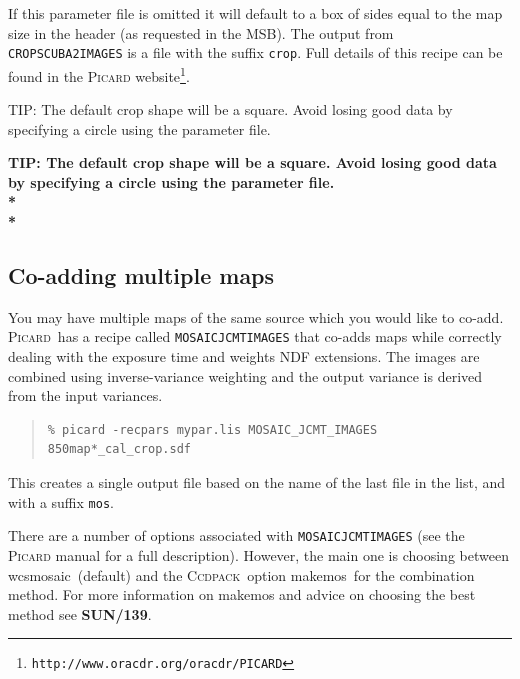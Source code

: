 \documentclass[twoside,11pt]{article}
\newcommand{\htmladdnormallink}[2]{#1}
\newenvironment{latexonly}{}{}
\newcommand{\latex}[1]{#1}
\newcommand{\xref}[3]{#1}
\newcommand{\xlabel}[1]{}
\renewcommand{\_}{\texttt{\symbol{95}}}
\newenvironment{fmpage}[1]{\begin{lrbox}{\fmbox}\begin{minipage}{#1}}{\end{minipage}\end{lrbox}\fbox{\usebox{\fmbox}}}
\newenvironment{myquote}{
   \color{MidnightBlue}\begin{quote}\begin{small}}{
   \end{small}\end{quote}
}
\newcommand{\ccdpack}{\xref{\textsc{Ccdpack}}{sun139}{}}
\newcommand{\picard}{\xref{\textsc{Picard}}{sun265}{}}
\newcommand{\drrecipe}[1]{\texttt{#1}}
\newcommand{\task}[1]{\textsf{#1}}
\newcommand{\file}[1]{\texttt{#1}}
\newcommand{\url}[1]{\texttt{#1}}
\newcommand{\wcsmosaic}{\xref{\task{wcsmosaic}}{sun95}{WCSMOSAIC}}
\newcommand{\makemos}{\xref{\task{makemos}}{sun139}{MAKEMOS}}
\renewenvironment{myquote}{
      \begin{quote}\begin{small}}{
      \end{small}\end{quote}
   }
\begin{document}
If this parameter file is omitted it will default to a box of sides
equal to the map size in the header (as requested in the MSB). The
output from \drrecipe{CROP\_SCUBA2\_IMAGES} is a file with the suffix
\file{\_crop}. Full details of this recipe can be found in the
\htmladdnormallink{\textsc{Picard}
website}{http://www.oracdr.org/oracdr/PICARD}\latex{\footnote{\url{http://www.oracdr.org/oracdr/PICARD}}}.

\begin{latexonly}
\begin{center}
\begin{fmpage}{0.95\linewidth}
\vspace{0.1cm}
TIP: The default crop shape will be a square. Avoid losing good data
by specifying a circle using the parameter file.
\end{fmpage}
\end{center}
\end{latexonly}

\begin{htmlonly}
\textbf{TIP: The default crop shape will be a square. Avoid losing
good data by specifying a circle using the parameter file.\\*\\*}
\end{htmlonly}


\subsection{\xlabel{coadd}Co-adding multiple maps}
\label{sec:coadd}

You may have multiple maps of the same source which you would like to
co-add. \picard\ has a recipe called
\xref{\drrecipe{MOSAIC\_JCMT\_IMAGES}}{sun265}{MOSAIC_JCMT_IMAGES}
that co-adds maps while correctly dealing with the exposure time and
weights NDF extensions. The images are combined using inverse-variance
weighting and the output variance is derived from the input variances.
\begin{myquote}
\begin{verbatim}
% picard -recpars mypar.lis MOSAIC_JCMT_IMAGES 850map*_cal_crop.sdf
\end{verbatim}
\end{myquote}
This creates a single output file based on the name of the last file
in the list, and with a suffix \file{\_mos}.

There are a number of options associated with
\drrecipe{MOSAIC\_JCMT\_IMAGES} (see the \textsc{Picard} manual for a full
description). However, the main one is choosing between \wcsmosaic\
(default) and the \ccdpack\ option \makemos\ for the combination
method. For more information on \task{makemos} and advice on choosing the
best method see \xref{\textbf{SUN/139}}{sun139}{}.
\end{document}
